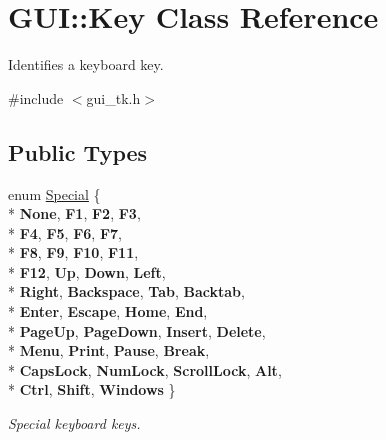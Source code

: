 \hypertarget{classGUI_1_1Key}{\section{G\-U\-I\-:\-:Key Class Reference}
\label{classGUI_1_1Key}
}


Identifies a keyboard key.  




{\ttfamily \#include $<$gui\-\_\-tk.\-h$>$}

\subsection*{Public Types}
\begin{DoxyCompactItemize}
\item 
enum \hyperlink{classGUI_1_1Key_a9d3f8dbfc08f0189dbb8aa5a20b9ea99}{Special} \{ \\*
{\bfseries None}, 
{\bfseries F1}, 
{\bfseries F2}, 
{\bfseries F3}, 
\\*
{\bfseries F4}, 
{\bfseries F5}, 
{\bfseries F6}, 
{\bfseries F7}, 
\\*
{\bfseries F8}, 
{\bfseries F9}, 
{\bfseries F10}, 
{\bfseries F11}, 
\\*
{\bfseries F12}, 
{\bfseries Up}, 
{\bfseries Down}, 
{\bfseries Left}, 
\\*
{\bfseries Right}, 
{\bfseries Backspace}, 
{\bfseries Tab}, 
{\bfseries Backtab}, 
\\*
{\bfseries Enter}, 
{\bfseries Escape}, 
{\bfseries Home}, 
{\bfseries End}, 
\\*
{\bfseries Page\-Up}, 
{\bfseries Page\-Down}, 
{\bfseries Insert}, 
{\bfseries Delete}, 
\\*
{\bfseries Menu}, 
{\bfseries Print}, 
{\bfseries Pause}, 
{\bfseries Break}, 
\\*
{\bfseries Caps\-Lock}, 
{\bfseries Num\-Lock}, 
{\bfseries Scroll\-Lock}, 
{\bfseries Alt}, 
\\*
{\bfseries Ctrl}, 
{\bfseries Shift}, 
{\bfseries Windows}
 \}
\begin{DoxyCompactList}\small\item\em Special keyboard keys. \end{DoxyCompactList}\end{DoxyCompactItemize}

